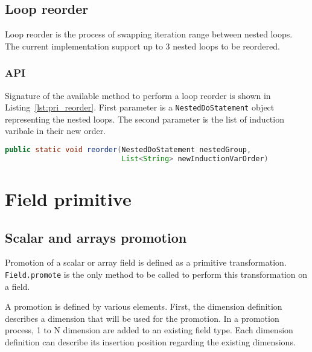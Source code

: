 \subsection{Loop reorder}
Loop reorder is the process of swapping iteration range between nested loops.
The current implementation support up to 3 nested loops to be reordered.
\subsubsection{API}
Signature of the available method to perform a loop reorder is shown in 
Listing~\ref{lst:pri_reorder}. First parameter is a 
\lstinline|NestedDoStatement| object representing the nested loops. The second
parameter is the list of induction varibale in their new order.

\begin{lstlisting}[label=lst:pri_reorder, language=java,title=Loop.java - reorder]
public static void reorder(NestedDoStatement nestedGroup,
                           List<String> newInductionVarOrder)
\end{lstlisting}


\section{Field primitive}


\subsection{Scalar and arrays promotion}
Promotion of a scalar or array field is defined as a primitive transformation.
\lstinline|Field.promote| is the only method to be called to perform
this transformation on a field.

A promotion is defined by various elements. First, the dimension definition 
describes a dimension that will be used for the promotion.
In a promotion process, 1 to N dimension are added to an existing field type. 
Each dimension definition can describe its insertion position regarding the 
existing dimensions.


